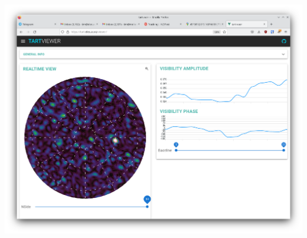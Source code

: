 \documentclass[ignorenonframetext]{beamer}
\begin{document}
\begin{frame}
 \includegraphics[width=\linewidth]{fig/browser_view.png}
\end{frame}
\end{document}
